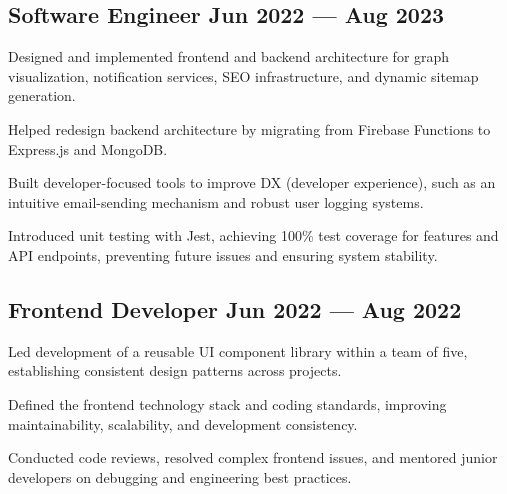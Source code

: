 \subsection{{Software Engineer \hfill Jun 2022 --- Aug 2023}}
\begin{zitemize}
\item Designed and implemented frontend and backend architecture for graph visualization, notification services, SEO infrastructure, and dynamic sitemap generation.
\item Helped redesign backend architecture by migrating from Firebase Functions to Express.js and MongoDB.
\item Built developer-focused tools to improve DX (developer experience), such as an intuitive email-sending mechanism and robust user logging systems.
\item Introduced unit testing with Jest, achieving 100\% test coverage for features and API endpoints, preventing future issues and ensuring system stability.
\end{zitemize}

\subsection{{Frontend Developer \hfill Jun 2022 --- Aug 2022}}
\begin{zitemize}
\item Led development of a reusable UI component library within a team of five, establishing consistent design patterns across projects.
\item Defined the frontend technology stack and coding standards, improving maintainability, scalability, and development consistency.
\item Conducted code reviews, resolved complex frontend issues, and mentored junior developers on debugging and engineering best practices.
\end{zitemize}

